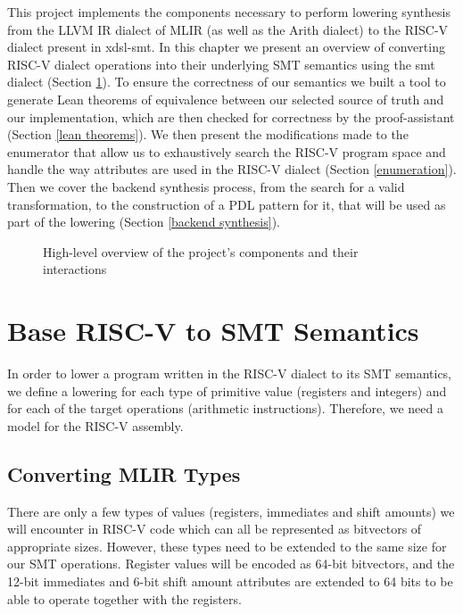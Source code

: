 This project implements the components necessary to perform lowering synthesis from the 
LLVM IR dialect of MLIR (as well as the Arith dialect) to the RISC-V dialect present in xdsl-smt.
%
In this chapter we present an overview of converting RISC-V dialect operations into 
their underlying SMT semantics using the smt dialect (Section \ref{RISC-V to SMT}).
%
To ensure the correctness of our semantics we built a tool to generate Lean theorems
of equivalence between our selected source of truth and our implementation, which are then
checked for correctness by the proof-assistant (Section \ref{lean theorems}).
%
We then present the modifications made to the enumerator that allow us to exhaustively search 
the RISC-V program space and handle the way attributes are used in the RISC-V dialect 
(Section \ref{enumeration}).
%
Then we cover the backend synthesis process, from the 
search for a valid transformation, to the construction of a PDL pattern for it, that will be used
as part of the lowering (Section \ref{backend synthesis}).

\begin{figure}
\resizebox{0.85\textwidth}{!}{

}
\caption{High-level overview of the project's components and their interactions}
\end{figure}

  

\section{Base RISC-V to SMT Semantics}
\label{RISC-V to SMT}

In order to lower a program written in the RISC-V dialect to its SMT semantics, 
we define a lowering for each type of primitive value (registers and integers) and for
each of the target operations (arithmetic instructions). Therefore, we need a model for
the RISC-V assembly.

\subsection{Converting MLIR Types}

There are only a few types of values (registers, immediates and shift amounts) we will encounter 
in RISC-V code which can all be represented as bitvectors of appropriate sizes. However, these 
types need to be extended to the same size for our SMT operations. Register values will be 
encoded as 64-bit bitvectors, and the 12-bit immediates and 6-bit shift amount attributes 
are extended to 64 bits to be able to operate together with the registers.

